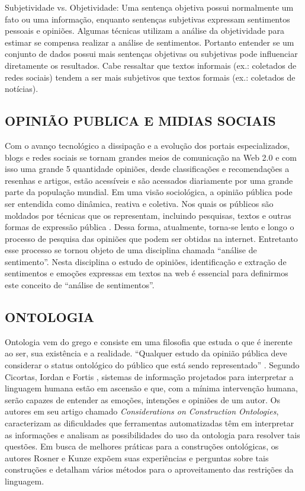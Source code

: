 \documentclass[12pt, a4paper]{article}
\begin{document}
Subjetividade vs. Objetividade: Uma sentença objetiva possui normalmente um fato ou uma informação, enquanto sentenças subjetivas expressam sentimentos pessoais e opiniões. Algumas técnicas utilizam a análise da objetividade para estimar se compensa realizar a análise de sentimentos. Portanto entender se um conjunto de dados possui mais sentenças objetivas ou subjetivas pode influenciar diretamente os resultados. Cabe ressaltar que textos informais (ex.: coletados de redes sociais) tendem a ser mais subjetivos que textos formais (ex.: coletados de notícias).

\newpage
\subsection{OPINIÃO PUBLICA E MIDIAS SOCIAIS}
\hspace*{0.8cm}Com o avanço tecnológico a dissipação e a evolução dos portais especializados, blogs e redes sociais se tornam grandes meios de comunicação na Web 2.0 e com isso uma grande  5 quantidade opiniões, desde classificações e recomendações a resenhas e artigos, estão acessíveis e são acessados diariamente por uma grande parte da população mundial. Em uma visão sociológica, a opinião pública pode ser entendida como dinâmica, reativa e coletiva. Nos quais os públicos são moldados por técnicas que os representam, incluindo pesquisas, textos e outras formas de expressão pública \cite{Perrin}. Dessa forma, atualmente, torna-se lento e longo o processo de pesquisa das opiniões que podem ser obtidas na internet. Entretanto esse processo se tornou objeto de uma disciplina chamada “análise de sentimento”. Nesta disciplina o estudo de opiniões, identificação e extração de sentimentos e emoções expressas em textos na web é essencial para definirmos este conceito de “análise de sentimentos”.

\subsection{ONTOLOGIA}

\hspace*{0.8cm}Ontologia vem do grego e consiste em uma filosofia que estuda o que é inerente ao ser, sua existência e a realidade. “Qualquer estudo da opinião pública deve considerar o status ontológico do público que está sendo representado” \cite{Perrin}. Segundo Cicortas, Iordan e Fortis \citeyear{Cicortas}, sistemas de informação projetados para interpretar a linguagem humana estão em ascensão e que, com a mínima intervenção humana, serão capazes de entender as emoções, intenções e opiniões de um autor. Os autores em seu artigo chamado \textit{Considerations on Construction Ontologies}, caracterizam as dificuldades que ferramentas automatizadas têm em interpretar as informações e analisam as possibilidades do uso da ontologia para resolver tais questões. Em busca de melhores práticas para a construções ontológicas, os autores Rosner e Kunze \citeyear{Kunze} expõem suas experiências e perguntas sobre tais construções e detalham vários métodos para o aproveitamento das restrições da linguagem.
\end{document}
